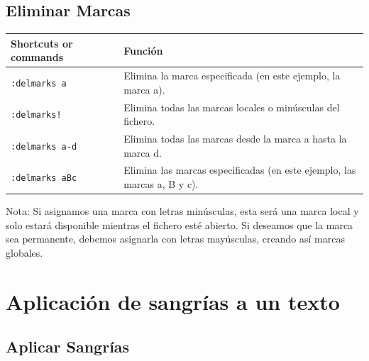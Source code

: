 \documentclass[
  doc,
  floatsintext,
  longtable,
  a4paper,
  nolmodern,
  notxfonts,
  notimes,
  12pt,
  colorlinks=true,linkcolor=blue,citecolor=blue,urlcolor=blue]{apa7}
\newcounter{none} %
\begin{document}
\subsection{Eliminar Marcas}\label{eliminar-marcas}

{\def\LTcaptype{none} %
\begin{longtable}[]{@{}
  >{\raggedright\arraybackslash}p{}
  >{\raggedright\arraybackslash}p{}@{}}
\toprule\noalign{}
\begin{minipage}[b]{\linewidth}\raggedright
Shortcuts or commands
\end{minipage} & \begin{minipage}[b]{\linewidth}\raggedright
Función
\end{minipage} \\
\midrule\noalign{}
\endhead
\bottomrule\noalign{}
\endlastfoot
\texttt{:delmarks\ a} & Elimina la marca especificada (en este ejemplo,
la marca a). \\
\texttt{:delmarks!} & Elimina todas las marcas locales o minúsculas del
fichero. \\
\texttt{:delmarks\ a-d} & Elimina todas las marcas desde la marca a
hasta la marca d. \\
\texttt{:delmarks\ aBc} & Elimina las marcas especificadas (en este
ejemplo, las marcas a, B y c). \\
\end{longtable}
}

Nota: Si asignamos una marca con letras minúsculas, esta será una marca
local y solo estará disponible mientras el fichero esté abierto. Si
deseamos que la marca sea permanente, debemos asignarla con letras
mayúsculas, creando así marcas globales.

\section{Aplicación de sangrías a un
texto}\label{aplicaciuxf3n-de-sangruxedas-a-un-texto}

\subsection{Aplicar Sangrías}\label{aplicar-sangruxedas}
\end{document}
